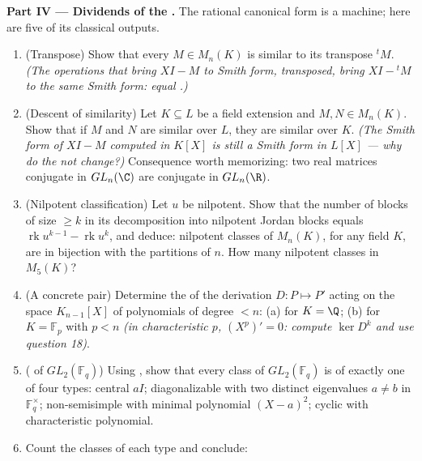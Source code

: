 \begin{problem}
\medskip
\noindent\textbf{Part IV --- Dividends of the .} The rational canonical form is a machine; here are
five of its classical outputs.
\begin{enumerate}[resume]
  \item (Transpose) Show that every $M \in M_n(K)$ is similar to
        its transpose ${}^tM$. \emph{(The operations that bring
        $XI - M$ to Smith form, transposed, bring $XI - {}^tM$ to
        the same Smith form: equal .)}
  \item (Descent of similarity) Let $K \subseteq L$ be a field
        extension and $M, N \in M_n(K)$. Show that if $M$ and $N$
        are similar over $L$, they are similar over $K$.
        \emph{(The Smith form of $XI - M$ computed in $K[X]$ is
        still a Smith form in $L[X]$ --- why do the  not change?)} Consequence worth memorizing: two
        real matrices conjugate in $GL_n(\C)$ are conjugate in
        $GL_n(\R)$.
  \item (Nilpotent classification) Let $u$ be nilpotent. Show
        that the number of blocks of size $\geq k$ in its
        decomposition into nilpotent Jordan blocks equals
        $\operatorname{rk}u^{k-1} - \operatorname{rk}u^k$, and
        deduce: nilpotent classes of $M_n(K)$, for any field $K$,
        are in bijection with the partitions of $n$. How many
        nilpotent classes in $M_5(K)$?
  \item (A concrete pair) Determine the  of
        the derivation $D\colon P \mapsto P'$ acting on the space
        $K_{n-1}[X]$ of polynomials of degree $< n$: (a) for $K =
        \Q$; (b) for $K = \mathbb F_p$ with $p < n$
        \emph{(in characteristic $p$, $(X^p)' = 0$: compute
        $\ker D^k$ and use question 18)}.
  \item ( of $GL_2(\mathbb F_q)$) Using
        , show that every class of
        $GL_2(\mathbb F_q)$ is of exactly one of four types:
        central $aI$; diagonalizable with two distinct
        eigenvalues $a \neq b$ in $\mathbb F_q^\times$;
        non-semisimple with minimal polynomial $(X - a)^2$;
        cyclic with  characteristic polynomial.
  \item Count the classes of each type and conclude:

\end{enumerate}
\end{problem}
